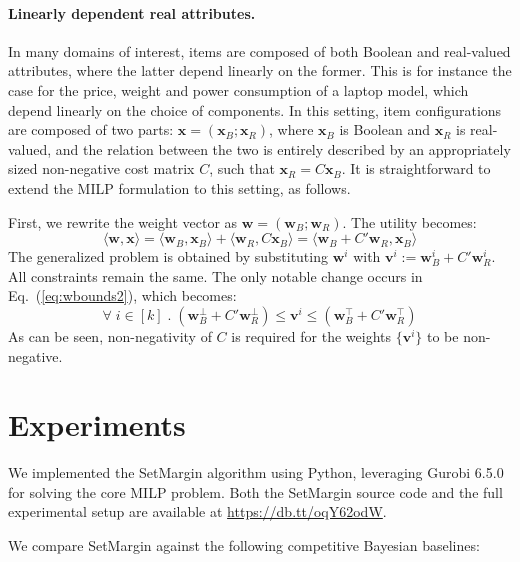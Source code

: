 \documentclass{article}
\renewcommand\[{\begin{equation}}
\renewcommand\]{\end{equation}}
\newcommand{\vecvar}[1]{\ensuremath{\boldsymbol{#1}}}
\newcommand{\vv}{\vecvar{v}}
\newcommand{\vw}{\vecvar{w}}
\newcommand{\vx}{\vecvar{x}}
\begin{document}
\paragraph{Linearly dependent real attributes.} In many domains of interest,
items are composed of both Boolean and real-valued attributes, where the latter
depend linearly  on the former. This is for instance the case for the price,
weight and power consumption of a laptop model, which depend linearly on the
choice of components.
%
In this setting, item configurations are composed of two parts: $\vx =
(\vx_B;\vx_R)$, where $\vx_B$ is Boolean and $\vx_R$ is real-valued, and the
relation between the two is entirely described by an appropriately sized
non-negative cost matrix $C$, such that $\vx_R = C \vx_B$. It is
straightforward to extend the MILP formulation to this setting, as follows.

First, we rewrite the weight vector as $\vw = (\vw_B;\vw_R)$. The utility
becomes:
%
$$ \langle \vw, \vx \rangle = \langle \vw_B, \vx_B \rangle + \langle \vw_R, C \vx_B \rangle = \langle \vw_B + C' \vw_R, \vx_B \rangle $$
%
The generalized problem is obtained by substituting $\vw^i$ with $\vv^i :=
\vw_B^i + C' \vw_R^i$.  All constraints remain the same. The only notable
change occurs in Eq.~(\ref{eq:wbounds2}), which becomes:
%
$$ \forall \; i \in [k] \;.\; (\vw_B^\bot + C' \vw_R^\bot) \le \vv^i \le (\vw_B^\top + C' \vw_R^\top)$$
%
As can be seen, non-negativity of $C$ is required for the weights $\{\vv^i\}$
to be non-negative.

\section{Experiments}
\label{sec:experiments}

We implemented the {\sc SetMargin} algorithm using Python, leveraging Gurobi
6.5.0 for solving the core MILP problem. Both the {\sc SetMargin} source code
and the full experimental setup are available at \url{https://db.tt/oqY62odW}.

We compare {\sc SetMargin} against the following competitive Bayesian baselines:
\end{document}
